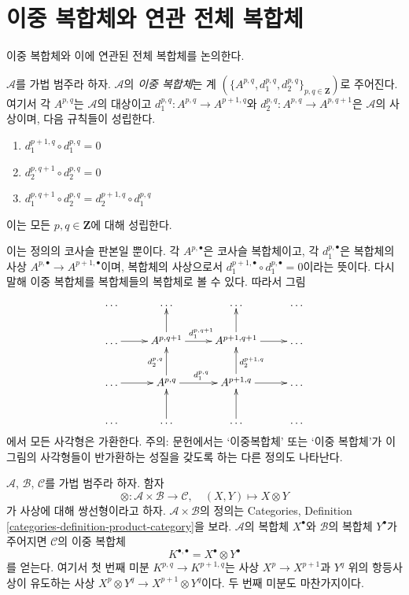 \section{이중 복합체와 연관 전체 복합체}
\label{section-double-complexes}

\noindent
이중 복합체와 이에 연관된 전체 복합체를 논의한다.

\begin{definition}
\label{definition-double-complex}
$\mathcal{A}$를 가법 범주라 하자.
$\mathcal{A}$의 {\it 이중 복합체}는 계
$(\{A^{p, q}, d_1^{p, q}, d_2^{p, q}\}_{p, q\in \mathbf{Z}})$로
주어진다. 여기서 각 $A^{p, q}$는 $\mathcal{A}$의 대상이고
$d_1^{p, q} : A^{p, q} \to A^{p + 1, q}$와
$d_2^{p, q} : A^{p, q} \to A^{p, q + 1}$은 $\mathcal{A}$의
사상이며, 다음 규칙들이 성립한다.
\begin{enumerate}
\item $d_1^{p + 1, q} \circ d_1^{p, q} = 0$
\item $d_2^{p, q + 1} \circ d_2^{p, q} = 0$
\item $d_1^{p, q + 1} \circ d_2^{p, q} = d_2^{p + 1, q} \circ d_1^{p, q}$
\end{enumerate}
이는 모든 $p, q \in \mathbf{Z}$에 대해 성립한다.
\end{definition}

\noindent
이는 정의의 코사슬 판본일 뿐이다.
각 $A^{p, \bullet}$은 코사슬 복합체이고, 각
$d_1^{p, \bullet}$은 복합체의 사상
$A^{p, \bullet} \to A^{p + 1, \bullet}$이며, 복합체의 사상으로서
$d_1^{p + 1, \bullet} \circ d_1^{p, \bullet} = 0$이라는 뜻이다.
다시 말해 이중 복합체를 복합체들의 복합체로 볼 수 있다.
따라서 그림
$$
\xymatrix{
\ldots &
\ldots &
\ldots &
\ldots \\
\ldots \ar[r] &
A^{p, q + 1} \ar[r]^{d_1^{p, q + 1}} \ar[u] &
A^{p + 1, q + 1} \ar[r] \ar[u] &
\ldots \\
\ldots \ar[r] &
A^{p, q} \ar[r]^{d_1^{p, q}} \ar[u]^{d_2^{p, q}} &
A^{p + 1, q} \ar[r] \ar[u]_{d_2^{p + 1, q}} &
\ldots \\
\ldots &
\ldots \ar[u] &
\ldots \ar[u] &
\ldots
}
$$
에서 모든 사각형은 가환한다.
주의: 문헌에서는 ‘이중복합체’ 또는 ‘이중 복합체’가 이 그림의
사각형들이 반가환하는 성질을 갖도록 하는 다른 정의도 나타난다.

\begin{example}
\label{example-double-complex-as-tensor-product-of}
$\mathcal{A}$, $\mathcal{B}$, $\mathcal{C}$를 가법 범주라 하자.
함자
$$
\otimes : \mathcal{A} \times \mathcal{B} \longrightarrow \mathcal{C},
\quad
(X, Y) \longmapsto X \otimes Y
$$
가 사상에 대해 쌍선형이라고 하자.
$\mathcal{A} \times \mathcal{B}$의 정의는 Categories, Definition
\ref{categories-definition-product-category}을 보라.
$\mathcal{A}$의 복합체 $X^\bullet$와 $\mathcal{B}$의 복합체
$Y^\bullet$가 주어지면 $\mathcal{C}$의 이중 복합체
$$
K^{\bullet, \bullet} = X^\bullet \otimes Y^\bullet
$$
를 얻는다. 여기서 첫 번째 미분 $K^{p, q} \to K^{p + 1, q}$는
사상 $X^p \to X^{p + 1}$과 $Y^q$ 위의 항등사상이 유도하는 사상
$X^p \otimes Y^q \to X^{p + 1} \otimes Y^q$이다.
두 번째 미분도 마찬가지이다.
\end{example}

